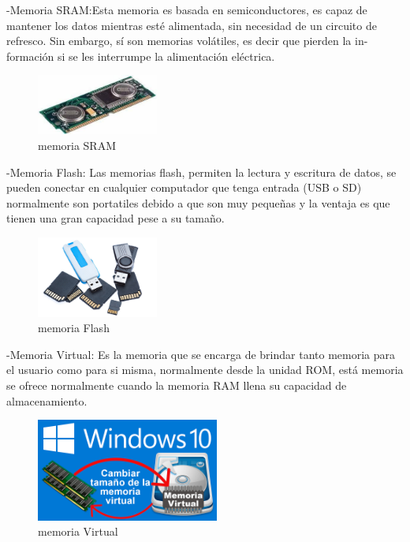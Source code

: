 \documentclass{article}
\begin{document}
-Memoria SRAM:Esta  memoria  es basada  en  semiconductores,  es  capaz de  mantener  los  datos mientras  esté  alimentada,  sin  necesidad  de  un  circuito de  refresco.  Sin  embargo,  sí  son  memorias  volátiles,  es  decir  que  pierden  la  in- formación si se les interrumpe la alimentación eléctrica. \newline

\begin{figure}[h]
\includegraphics[width=4cm]{Estatica.jpg}
\centering
\caption{memoria SRAM}
\end{figure}

-Memoria Flash: Las memorias flash, permiten la lectura y escritura de datos, se pueden conectar en cualquier computador que tenga entrada (USB o SD) normalmente son portatiles debido a que son muy pequeñas y la ventaja es que tienen una gran capacidad pese a su tamaño. \newline
\begin{figure}[h]
\includegraphics[width=4cm]{Flash.jpg}
\centering
\caption{memoria Flash}
\end{figure}

-Memoria Virtual: Es la memoria que se encarga de brindar tanto memoria para el usuario como para si misma, normalmente desde la unidad ROM, está memoria se ofrece normalmente cuando la memoria RAM llena su capacidad de almacenamiento. \newline
\begin{figure}[h]
\includegraphics[width=6cm]{Virtual.png}
\centering
\caption{memoria Virtual}
\end{figure}
\end{document}
